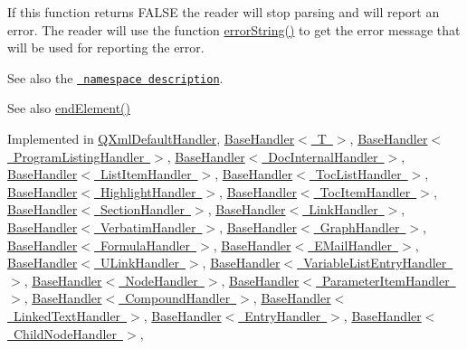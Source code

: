 If this function returns F\+A\+L\+SE the reader will stop parsing and will report an error. The reader will use the function \mbox{\hyperlink{class_q_xml_content_handler_adba96547bad1cf1b009dbfb7b7c571be}{error\+String()}} to get the error message that will be used for reporting the error.

See also the \href{xml-sax.html\#namespaces}{\texttt{ namespace description}}.

\begin{DoxySeeAlso}{See also}
\mbox{\hyperlink{class_q_xml_content_handler_af0abc06326798a6e522f91e6174b7b9e}{end\+Element()}} 
\end{DoxySeeAlso}


Implemented in \mbox{\hyperlink{class_q_xml_default_handler_a0381a337b32a16d2ef2a8df9a29cb215}{Q\+Xml\+Default\+Handler}}, \mbox{\hyperlink{class_base_handler_a15c20baf7065b3eb92ae7a336ccdf20b}{Base\+Handler$<$ T $>$}}, \mbox{\hyperlink{class_base_handler_a15c20baf7065b3eb92ae7a336ccdf20b}{Base\+Handler$<$ Program\+Listing\+Handler $>$}}, \mbox{\hyperlink{class_base_handler_a15c20baf7065b3eb92ae7a336ccdf20b}{Base\+Handler$<$ Doc\+Internal\+Handler $>$}}, \mbox{\hyperlink{class_base_handler_a15c20baf7065b3eb92ae7a336ccdf20b}{Base\+Handler$<$ List\+Item\+Handler $>$}}, \mbox{\hyperlink{class_base_handler_a15c20baf7065b3eb92ae7a336ccdf20b}{Base\+Handler$<$ Toc\+List\+Handler $>$}}, \mbox{\hyperlink{class_base_handler_a15c20baf7065b3eb92ae7a336ccdf20b}{Base\+Handler$<$ Highlight\+Handler $>$}}, \mbox{\hyperlink{class_base_handler_a15c20baf7065b3eb92ae7a336ccdf20b}{Base\+Handler$<$ Toc\+Item\+Handler $>$}}, \mbox{\hyperlink{class_base_handler_a15c20baf7065b3eb92ae7a336ccdf20b}{Base\+Handler$<$ Section\+Handler $>$}}, \mbox{\hyperlink{class_base_handler_a15c20baf7065b3eb92ae7a336ccdf20b}{Base\+Handler$<$ Link\+Handler $>$}}, \mbox{\hyperlink{class_base_handler_a15c20baf7065b3eb92ae7a336ccdf20b}{Base\+Handler$<$ Verbatim\+Handler $>$}}, \mbox{\hyperlink{class_base_handler_a15c20baf7065b3eb92ae7a336ccdf20b}{Base\+Handler$<$ Graph\+Handler $>$}}, \mbox{\hyperlink{class_base_handler_a15c20baf7065b3eb92ae7a336ccdf20b}{Base\+Handler$<$ Formula\+Handler $>$}}, \mbox{\hyperlink{class_base_handler_a15c20baf7065b3eb92ae7a336ccdf20b}{Base\+Handler$<$ E\+Mail\+Handler $>$}}, \mbox{\hyperlink{class_base_handler_a15c20baf7065b3eb92ae7a336ccdf20b}{Base\+Handler$<$ U\+Link\+Handler $>$}}, \mbox{\hyperlink{class_base_handler_a15c20baf7065b3eb92ae7a336ccdf20b}{Base\+Handler$<$ Variable\+List\+Entry\+Handler $>$}}, \mbox{\hyperlink{class_base_handler_a15c20baf7065b3eb92ae7a336ccdf20b}{Base\+Handler$<$ Node\+Handler $>$}}, \mbox{\hyperlink{class_base_handler_a15c20baf7065b3eb92ae7a336ccdf20b}{Base\+Handler$<$ Parameter\+Item\+Handler $>$}}, \mbox{\hyperlink{class_base_handler_a15c20baf7065b3eb92ae7a336ccdf20b}{Base\+Handler$<$ Compound\+Handler $>$}}, \mbox{\hyperlink{class_base_handler_a15c20baf7065b3eb92ae7a336ccdf20b}{Base\+Handler$<$ Linked\+Text\+Handler $>$}}, \mbox{\hyperlink{class_base_handler_a15c20baf7065b3eb92ae7a336ccdf20b}{Base\+Handler$<$ Entry\+Handler $>$}}, \mbox{\hyperlink{class_base_handler_a15c20baf7065b3eb92ae7a336ccdf20b}{Base\+Handler$<$ Child\+Node\+Handler $>$}}, 